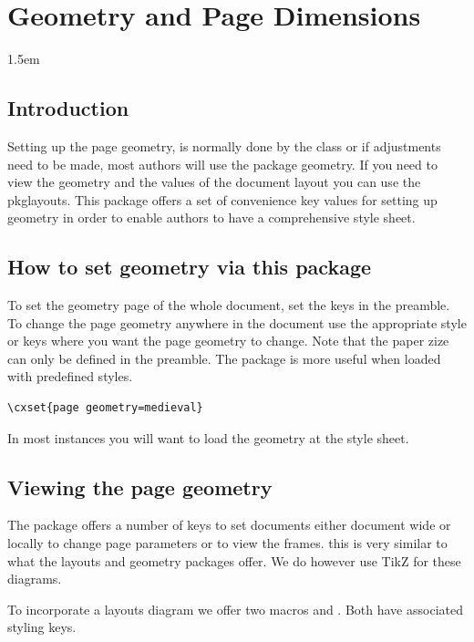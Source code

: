 \chapter{Geometry and Page Dimensions}
\parindent1.5em

\section{Introduction}

Setting up the page geometry, is normally done by the class or if adjustments need to be made, most authors will use the package geometry. If you need to view the geometry and the values of the document layout you can use the pkg{layouts}. This package offers a set of convenience key values for setting up geometry in order to enable authors to have a comprehensive style sheet.

\section{How to set geometry via this package}

To set the geometry page of the whole document, set the keys in the preamble. To change the page geometry anywhere in the document use the appropriate style or keys where you want the page geometry to change.
Note that the paper zize can only be defined in the preamble. The package is more useful when loaded with predefined styles.

\begin{tcolorbox}
\begin{lstlisting}
\cxset{page geometry=medieval}
\end{lstlisting}
\end{tcolorbox}

In most instances you will want to load the geometry at the style sheet.


\section{Viewing the page geometry}

The package offers a number of keys to set documents either document wide or locally to change page 
parameters or to view the frames. this is very similar to what the layouts and geometry packages offer. We do
however use TikZ for these diagrams.

To incorporate a layouts diagram we offer two macros  and . Both have associated styling keys.
\medskip

